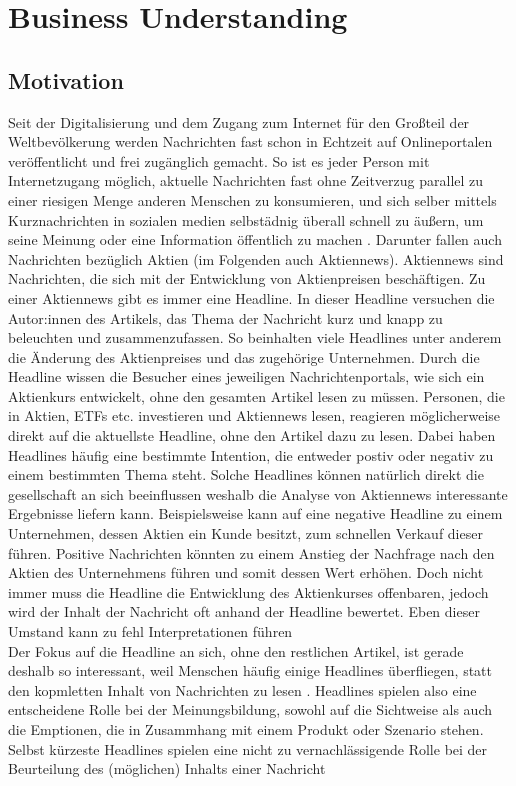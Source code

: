 \chapter{Business Understanding}
\section*{Motivation}
Seit der Digitalisierung und dem Zugang zum Internet für den Großteil der Weltbevölkerung werden Nachrichten fast schon in Echtzeit auf Onlineportalen veröffentlicht und frei zugänglich gemacht. So ist es jeder Person mit Internetzugang möglich, aktuelle Nachrichten fast ohne Zeitverzug parallel zu einer riesigen Menge anderen Menschen zu konsumieren, und sich selber mittels Kurznachrichten in sozialen medien selbstädnig überall schnell zu äußern, um seine Meinung oder eine Information öffentlich zu machen \citep{agarwel2016}. Darunter fallen auch Nachrichten bezüglich Aktien (im Folgenden auch Aktiennews). Aktiennews sind Nachrichten, die sich mit der Entwicklung von Aktienpreisen beschäftigen. Zu einer Aktiennews gibt es immer eine Headline. In dieser Headline versuchen die Autor:innen des Artikels, das Thema der Nachricht kurz und knapp zu beleuchten und zusammenzufassen. So beinhalten viele Headlines unter anderem die Änderung des Aktienpreises und das zugehörige Unternehmen. Durch die Headline wissen die Besucher eines jeweiligen Nachrichtenportals, wie sich ein Aktienkurs entwickelt, ohne den gesamten Artikel lesen zu müssen. Personen, die in Aktien, ETFs etc. investieren und Aktiennews lesen, reagieren möglicherweise direkt auf die aktuellste Headline, ohne den Artikel dazu zu lesen. Dabei haben Headlines häufig eine bestimmte Intention, die entweder postiv oder negativ zu einem bestimmten Thema steht. Solche Headlines können natürlich direkt die gesellschaft an sich beeinflussen \citep{agarwel2016} weshalb die Analyse von Aktiennews interessante Ergebnisse liefern kann. Beispielsweise kann auf eine negative Headline zu einem Unternehmen, dessen Aktien ein Kunde besitzt, zum schnellen Verkauf dieser führen. Positive Nachrichten könnten zu einem Anstieg der Nachfrage nach den Aktien des Unternehmens führen und somit dessen Wert erhöhen. Doch nicht immer muss die Headline die Entwicklung des Aktienkurses offenbaren, jedoch wird der Inhalt der Nachricht oft anhand der Headline bewertet. Eben dieser Umstand kann zu fehl Interpretationen führen \citep{dor2003}\\
Der Fokus auf die Headline an sich, ohne den restlichen Artikel, ist gerade deshalb so interessant, weil Menschen häufig einige Headlines überfliegen, statt den kopmletten Inhalt von Nachrichten zu lesen \citep{dor2003}. Headlines spielen also eine entscheidene Rolle bei der Meinungsbildung, sowohl auf die Sichtweise als auch die Emptionen, die in Zusammhang mit einem Produkt oder Szenario stehen. Selbst kürzeste Headlines spielen eine nicht zu vernachlässigende Rolle bei der Beurteilung des (möglichen) Inhalts einer Nachricht \citep{agarwel2016} \\ \\
